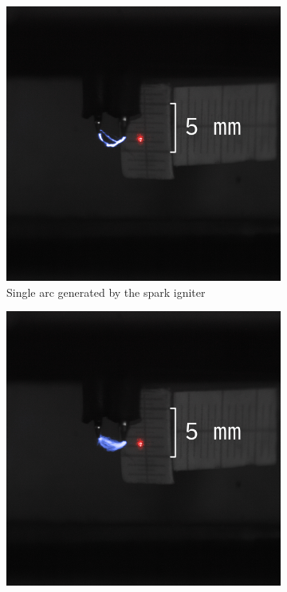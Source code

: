         \begin{figure}[h]
            \centering
            \begin{subfigure}[t]{0.47\textwidth}
                \centering
                \includegraphics[]{assets/3 design/sparkAlignment_one.jpg}
                \caption{Single arc generated by the spark igniter}
                \label{fig:sparkAlignment_one}
            \end{subfigure}
            \hfill
            \begin{subfigure}[t]{0.47\textwidth}
                \centering
                \includegraphics[]{assets/3 design/sparkAlignment.jpg}

\end{subfigure}
\end{figure}
